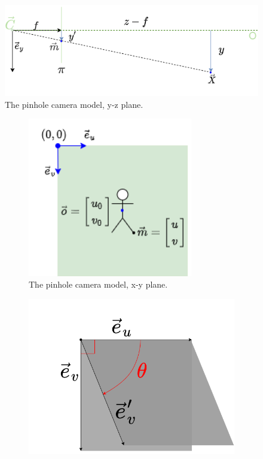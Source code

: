 \begin{figure}[ht]
    \centering
    \includegraphics[width=\textwidth]{graphics/td_scene_yz.png}
    \caption{The pinhole camera model, y-z plane.}
    \label{fig:td_scene_yz}
\end{figure}

\begin{figure}[ht]
    \begin{subfigure}[b]{0.49\textwidth}
      \includegraphics[width=0.79\textwidth]{graphics/td_scene_xy.png}
      \caption{The pinhole camera model, x-y plane.}
      \label{fig:td_scene_xy}
    \end{subfigure}
    \hfill
    \begin{subfigure}[b]{0.49\textwidth}
      \includegraphics[width=\textwidth]{graphics/pixel.png}

\end{subfigure}
\end{figure}
